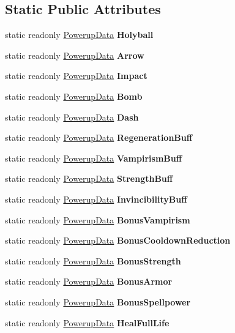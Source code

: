 \subsection*{Static Public Attributes}
\begin{DoxyCompactItemize}
\item 
static readonly \hyperlink{class_tentacle_slicers_1_1actors_1_1_powerup_data}{Powerup\+Data} {\bfseries Holyball}
\item 
static readonly \hyperlink{class_tentacle_slicers_1_1actors_1_1_powerup_data}{Powerup\+Data} {\bfseries Arrow}
\item 
static readonly \hyperlink{class_tentacle_slicers_1_1actors_1_1_powerup_data}{Powerup\+Data} {\bfseries Impact}
\item 
static readonly \hyperlink{class_tentacle_slicers_1_1actors_1_1_powerup_data}{Powerup\+Data} {\bfseries Bomb}
\item 
static readonly \hyperlink{class_tentacle_slicers_1_1actors_1_1_powerup_data}{Powerup\+Data} {\bfseries Dash}
\item 
static readonly \hyperlink{class_tentacle_slicers_1_1actors_1_1_powerup_data}{Powerup\+Data} {\bfseries Regeneration\+Buff}
\item 
static readonly \hyperlink{class_tentacle_slicers_1_1actors_1_1_powerup_data}{Powerup\+Data} {\bfseries Vampirism\+Buff}
\item 
static readonly \hyperlink{class_tentacle_slicers_1_1actors_1_1_powerup_data}{Powerup\+Data} {\bfseries Strength\+Buff}
\item 
static readonly \hyperlink{class_tentacle_slicers_1_1actors_1_1_powerup_data}{Powerup\+Data} {\bfseries Invincibility\+Buff}
\item 
static readonly \hyperlink{class_tentacle_slicers_1_1actors_1_1_powerup_data}{Powerup\+Data} {\bfseries Bonus\+Vampirism}
\item 
static readonly \hyperlink{class_tentacle_slicers_1_1actors_1_1_powerup_data}{Powerup\+Data} {\bfseries Bonus\+Cooldown\+Reduction}
\item 
static readonly \hyperlink{class_tentacle_slicers_1_1actors_1_1_powerup_data}{Powerup\+Data} {\bfseries Bonus\+Strength}
\item 
static readonly \hyperlink{class_tentacle_slicers_1_1actors_1_1_powerup_data}{Powerup\+Data} {\bfseries Bonus\+Armor}
\item 
static readonly \hyperlink{class_tentacle_slicers_1_1actors_1_1_powerup_data}{Powerup\+Data} {\bfseries Bonus\+Spellpower}
\item 
static readonly \hyperlink{class_tentacle_slicers_1_1actors_1_1_powerup_data}{Powerup\+Data} {\bfseries Heal\+Full\+Life}
\end{DoxyCompactItemize}


